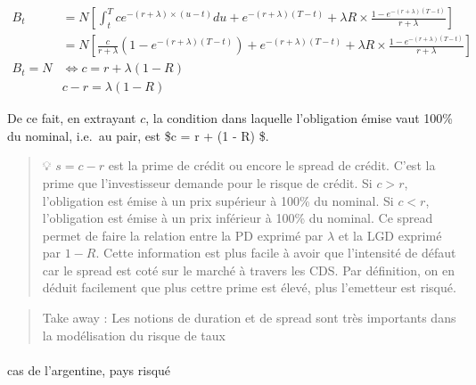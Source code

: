 \documentclass[
  letterpaper,
  DIV=11,
  numbers=noendperiod]{scrartcl}
\makeatletter
\let\oldparagraph\paragraph
\renewcommand{\paragraph}{
    \@ifstar
      \xxxParagraphStar
      \xxxParagraphNoStar
  }
\newcommand{\xxxParagraphStar}[1]{\oldparagraph*{#1}\mbox{}}
\newcommand{\xxxParagraphNoStar}[1]{\oldparagraph{#1}\mbox{}}
\makeatother
\begin{document}
\[
\begin{aligned}
B_t &= N \left[ \int_{t}^{T} c e^{-(r + \lambda) \times (u-t)} du + e^{-(r+\lambda)(T-t)} +  \lambda R \times \frac{1 - e^{-(r+\lambda)(T-t)}}{r+\lambda} \right]\\
&= N \left[ \frac{c}{r + \lambda} \left(1 - e^{-(r + \lambda)(T-t)} \right) + e^{-(r+\lambda)(T-t)} +  \lambda R \times \frac{1 - e^{-(r+\lambda)(T-t)}}{r+\lambda} \right]\\
B_t = N &\Leftrightarrow c = r + \lambda (1 - R) \\
& c - r = \lambda (1 - R) 
\end{aligned}
\]

De ce fait, en extrayant \(c\), la condition dans laquelle l'obligation
émise vaut 100\% du nominal, i.e.~au pair, est \$c = r + \lambda (1 - R)
\$.

\begin{quote}
💡 \(s = c-r\) est la prime de crédit ou encore le spread de crédit.
C'est la prime que l'investisseur demande pour le risque de crédit. Si
\(c > r\), l'obligation est émise à un prix supérieur à 100\% du
nominal. Si \(c < r\), l'obligation est émise à un prix inférieur à
100\% du nominal. Ce spread permet de faire la relation entre la PD
exprimé par \(\lambda\) et la LGD exprimé par \(1 -R\). Cette
information est plus facile à avoir que l'intensité de défaut car le
spread est coté sur le marché à travers les CDS. Par définition, on en
déduit facilement que plus cettre prime est élevé, plus l'emetteur est
risqué.
\end{quote}

\begin{quote}
Take away : Les notions de duration et de spread sont très importants
dans la modélisation du risque de taux
\end{quote}

\paragraph{cas de l'argentine, pays
risqué}\label{cas-de-largentine-pays-risquuxe9}
\end{document}
